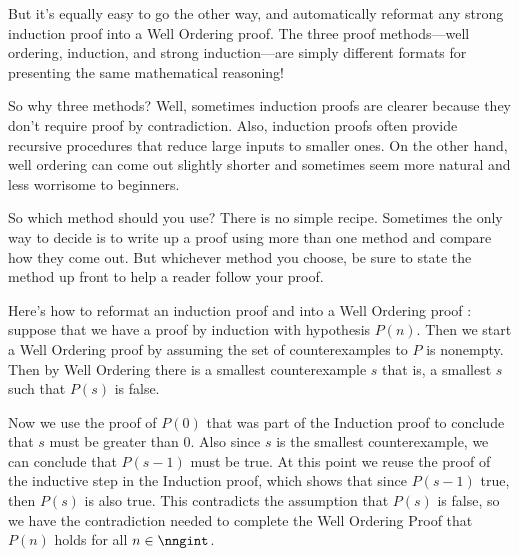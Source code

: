 But it's equally easy to go the other way, and automatically reformat
any strong induction proof into a Well Ordering proof.  The three
proof methods---well ordering, induction, and strong induction---are
simply different formats for presenting the same mathematical
reasoning!

So why three methods?  Well, sometimes induction proofs are clearer
because they don't require proof by contradiction.  Also, induction
proofs often provide recursive procedures that reduce large inputs to
smaller ones.  On the other hand, well ordering can come out slightly
shorter and sometimes seem more natural and less worrisome to
beginners.

So which method should you use?  There is no simple recipe.  Sometimes
the only way to decide is to write up a proof using more than one
method and compare how they come out.  But whichever method you
choose, be sure to state the method up front to help a reader follow
your proof.

\begin{editingnotes}
Here's how to reformat an induction proof and into a Well
Ordering proof : suppose that we have a proof by induction with
hypothesis $P(n)$.  Then we start a Well Ordering proof by assuming the
set of counterexamples to $P$ is nonempty.  Then by Well Ordering there is
a smallest counterexample $s$ that is, a smallest $s$ such that $P(s)$
is false.

Now we use the proof of $P(0)$ that was part of the Induction proof to
conclude that $s$ must be greater than 0.  Also since $s$ is the smallest
counterexample, we can conclude that $P(s-1)$ must be true.  At this point
we reuse the proof of the inductive step in the Induction proof, which
shows that since $P(s-1)$ true, then $P(s)$ is also true.  This
contradicts the assumption that $P(s)$ is false, so we have the
contradiction needed to complete the Well Ordering Proof that $P(n)$ holds
for all $n \in \nngint$.

\end{editingnotes}

\endinput
